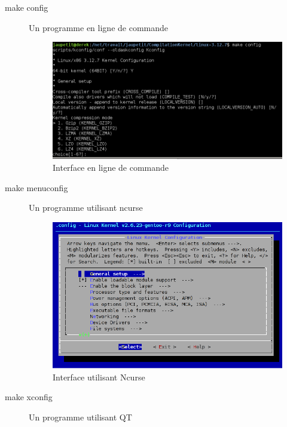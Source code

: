 \documentclass[17pts]{report}
\begin{document}
\begin{description}
\item[make config]              Un programme en ligne de commande \\
        \begin{figure}[H]
            \includegraphics[scale=0.7]{illustrations/configLine.png}
            \centering
            \caption{Interface en ligne de commande}
            \label{fig:MakeConfig}
        \end{figure}
        \pagebreak
    \item[make menuconfig]      Un programme utilisant ncurse \\
        \begin{figure}[H]
            \includegraphics[scale=0.7]{illustrations/menuconfig.png}
            \centering
            \caption{Interface utilisant Ncurse}
            \label{fig:MakeMenuConfig}
        \end{figure}
\item[make xconfig]             Un programme utilisant QT \\
        \begin{figure}[H]

\end{figure}
\end{description}
\end{document}
